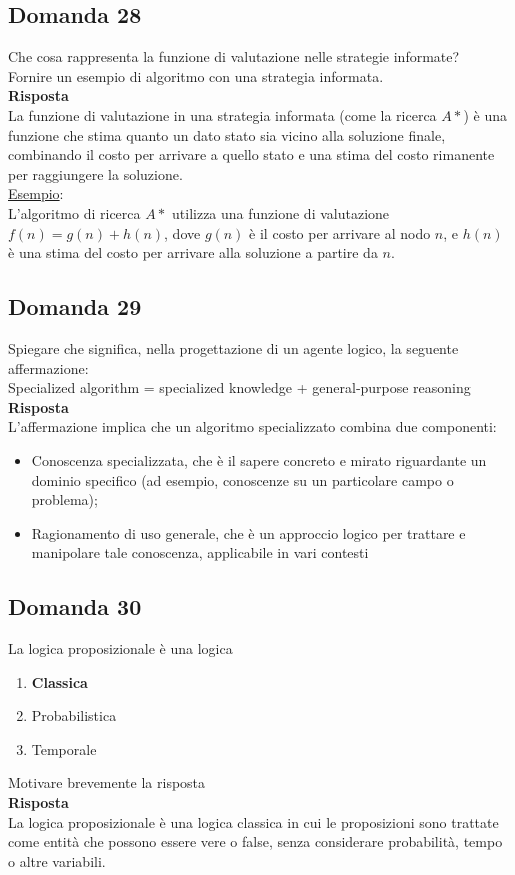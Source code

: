 \documentclass[../main.tex]{subfiles}
\begin{document}
	\subsection{Domanda 28}
	Che cosa rappresenta la funzione di valutazione nelle strategie informate?\\
	Fornire un esempio di algoritmo con una strategia informata.\\
	\textbf{Risposta}\\
	La funzione di valutazione in una strategia informata (come la ricerca $A*$) è una funzione che stima quanto un dato stato sia vicino alla soluzione finale, combinando il costo per arrivare a quello stato e una stima del costo rimanente per raggiungere la soluzione.\\
	\underline{Esempio}:\\
	L'algoritmo di ricerca $A*$ utilizza una funzione di valutazione $f(n)=g(n)+h(n)$, dove $g(n)$ è il costo per arrivare al nodo $n$, e $h(n)$ è una stima del costo per arrivare alla soluzione a partire da $n$.
	\subsection{Domanda 29}
	Spiegare che significa, nella progettazione di un agente logico, la seguente affermazione: \\
	Specialized algorithm = specialized knowledge + general‐purpose reasoning\\
	\textbf{Risposta}\\
	L'affermazione implica che un algoritmo specializzato combina due componenti: 
	\begin{itemize}
		\item Conoscenza specializzata, che è il sapere concreto e mirato riguardante un dominio specifico (ad esempio, conoscenze su un particolare campo o problema);
		\item Ragionamento di uso generale, che è un approccio logico per trattare e manipolare tale conoscenza, applicabile in vari contesti
	\end{itemize}
	\subsection{Domanda 30}
	La logica proposizionale è una logica
	\begin{enumerate}
		\item \textbf{Classica} 
		\item Probabilistica 
		\item Temporale 
	\end{enumerate}
	Motivare brevemente la risposta\\
	\textbf{Risposta}\\
	La logica proposizionale è una logica classica in cui le proposizioni sono trattate come entità che possono essere vere o false, senza considerare probabilità, tempo o altre variabili.
\end{document}
